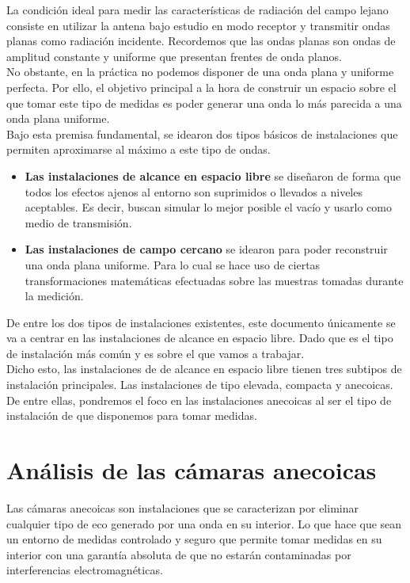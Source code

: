 \documentclass{article}
\begin{document}
La condición ideal para medir las características de radiación del campo lejano consiste en utilizar la antena bajo estudio en modo receptor y transmitir ondas planas como radiación incidente. Recordemos que las ondas planas son ondas de amplitud constante y uniforme que presentan frentes de onda planos.\\
No obstante, en la práctica no podemos disponer de una onda plana y uniforme perfecta. Por ello, el objetivo principal a la hora de construir un espacio sobre el que tomar este tipo de medidas es poder generar una onda lo más parecida a una onda plana uniforme. 
\\

Bajo esta premisa fundamental, se idearon dos tipos básicos de instalaciones que permiten aproximarse al máximo a este tipo de ondas. 

\begin{itemize}
    \item \textbf{Las instalaciones de alcance en espacio libre} se diseñaron de forma que todos los efectos ajenos al entorno son suprimidos o llevados a niveles aceptables. Es decir, buscan simular lo mejor posible el vacío y usarlo como medio de transmisión. 
    \item \textbf{Las instalaciones de campo cercano} se idearon para poder reconstruir una onda plana uniforme. Para lo cual se hace uso de ciertas transformaciones matemáticas efectuadas sobre las muestras tomadas durante la medición. 
\end{itemize}
De entre los dos tipos de instalaciones existentes, este documento únicamente se va a centrar en las instalaciones de alcance en espacio libre. Dado que es el tipo de instalación más común y es sobre el que vamos a trabajar.\\
Dicho esto, las instalaciones de de alcance en espacio libre tienen tres subtipos de instalación principales. Las instalaciones de tipo elevada, compacta y anecoicas. De entre ellas, pondremos el foco en las instalaciones anecoicas al ser el tipo de instalación de que disponemos para tomar medidas. 

\newpage

\section{Análisis de las cámaras anecoicas}

Las cámaras anecoicas son instalaciones que se caracterizan por eliminar cualquier tipo de eco generado por una onda en su interior. Lo que hace que sean un entorno de medidas controlado y seguro que permite tomar medidas en su interior con una garantía absoluta de que no estarán contaminadas por interferencias electromagnéticas.\\
\end{document}
